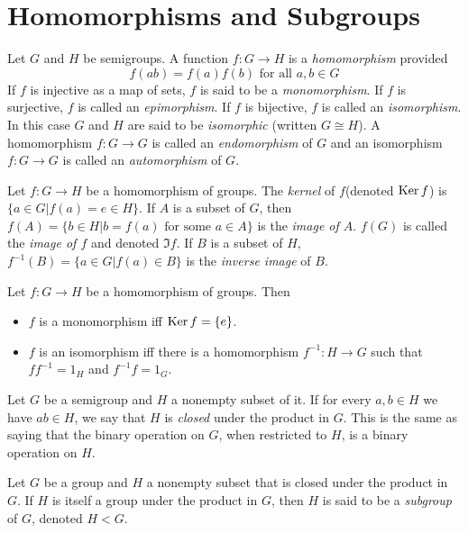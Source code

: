 \section{Homomorphisms and Subgroups}
\begin{definition}
	Let $ G $ and $ H $ be semigroups. A function $ f:G \to H $ is a \textit{homomorphism} provided
	\begin{equation}
		f(ab)=f(a)f(b) \text{ for all }a,b \in G\nonumber
	\end{equation}
	If $ f $ is injective as a map of sets, $ f $ is said to be a \textit{monomorphism}. If $ f $ is surjective, $ f $ is called an \textit{epimorphism}. If $ f $ is bijective, $ f $ is called an \textit{isomorphism}. In this case $ G $ and $ H $ are said to be \textit{isomorphic} (written $ G \cong H $). A homomorphism $ f:G \to G $ is called an \textit{endomorphism} of $ G $ and an isomorphism $ f:G \to G $ is called an \textit{automorphism} of $ G $.
\end{definition}
\begin{definition}
	Let $ f:G \to H $ be a homomorphism of groups. The \textit{kernel} of $ f $(denoted $ \operatorname{Ker}{f} $) is $ \{a\in G | f(a) = e \in H  \} $. If $ A $ is a subset of $ G $, then $ f(A)=\{b \in H | b= f(a) \text{ for some }a \in A \} $  is the \textit{image of $ A $}. $ f(G) $ is called the \textit{image of $ f $} and denoted $ \Im{f} $. If $ B $ is a subset of $ H $, $ f^{-1}(B)=\{a \in G |f(a) \in B  \} $ is the \textit{inverse image} of $ B $.
\end{definition}
\begin{theorem}
	Let $ f:G \to H $ be a homomorphism of groups. Then
	\begin{itemize}
		\item $ f $ is a monomorphism iff $ \operatorname{Ker}{f}=\{e\} $.
		\item $ f $ is an isomorphism iff there is a homomorphism $ f^{-1}:H \to G $ such that $ f f^{-1}=1_H $ and $ f^{-1}f=1_G $.
	\end{itemize}
\end{theorem}
\begin{definition}
	Let $ G $ be a semigroup and $ H $ a nonempty subset of it. If for every $ a,b \in H $ we have $ ab \in H $, we say that $ H $ is \textit{closed} under the product in $ G $. This is the same as saying that the binary operation on $ G $, when restricted to $ H $, is a binary operation on $ H $.
\end{definition}
\begin{definition}
	Let $ G $ be a group and $ H $ a nonempty subset that is closed under the product in $ G $. If $ H $ is itself a group under the product in $ G $, then $ H $ is said to be a \textit{subgroup} of $ G $, denoted $ H<G $.
\end{definition}
